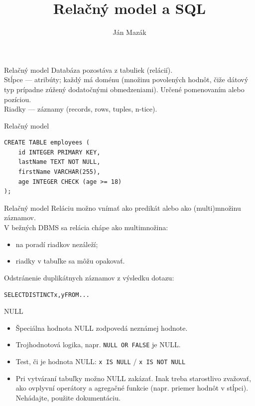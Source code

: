 \documentclass[12pt]{beamer}
\title{Relačný model a SQL}
\author{Ján Mazák}
\institute{FMFI UK Bratislava}
\date{}
\begin{document}
\frame{\titlepage}

\begin{frame}{Relačný model}
Databáza pozostáva z tabuliek (\alert{relácií}).\\[3mm]

Stĺpce --- \alert{atribúty}; každý má doménu (množinu povolených hodnôt, čiže dátový typ prípadne zúžený dodatočnými obmedzeniami). Určené pomenovaním alebo pozíciou.\\[3mm]

Riadky --- \alert{záznamy} (records, rows, tuples, n-tice).
\end{frame}

\begin{frame}[fragile]{Relačný model}
\begin{verbatim}
CREATE TABLE employees (
    id INTEGER PRIMARY KEY,
    lastName TEXT NOT NULL,
    firstName VARCHAR(255),
    age INTEGER CHECK (age >= 18)
);
\end{verbatim}
\end{frame}

\begin{frame}{Relačný model}
Reláciu možno vnímať ako predikát alebo ako (multi)množinu záznamov.\\[3mm]

V bežných DBMS sa relácia chápe ako multimnožina:
\begin{itemize}
\item na poradí riadkov nezáleží;
\item riadky v tabuľke sa môžu opakovať.
\end{itemize}

Odstránenie duplikátnych záznamov z výsledku dotazu:
\begin{alltt}
    SELECT \alert{DISTINCT} x, y FROM ...
\end{alltt}
\end{frame}

\begin{frame}[fragile]{NULL}
\begin{itemize}
\item Špeciálna hodnota \alert{NULL} zodpovedá neznámej hodnote.
\item Trojhodnotová logika, napr. \verb|NULL OR FALSE| je NULL.
\item Test, či je hodnota NULL: \verb|x IS NULL| / \verb|x IS NOT NULL|
\item Pri vytváraní tabuľky možno NULL zakázať.
Inak treba starostlivo zvažovať, ako ovplyvní operátory a agregačné funkcie (napr. priemer hodnôt v stĺpci).
Nehádajte, použite dokumentáciu.
\end{itemize}
\end{frame}
\end{document}
